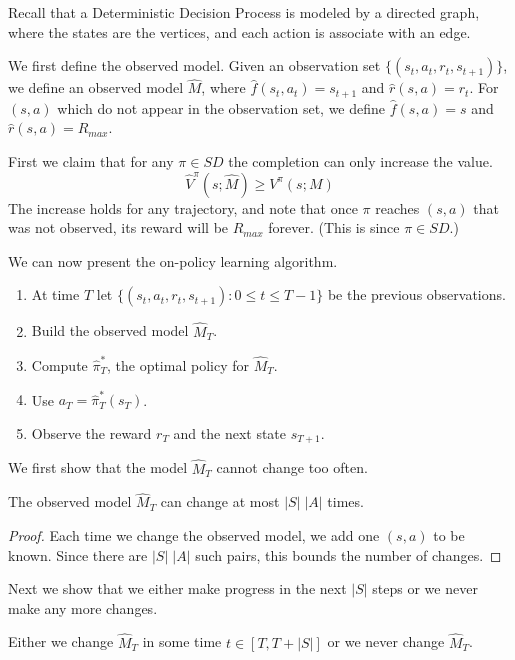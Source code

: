 Recall that a Deterministic Decision Process is modeled by a
directed graph, where the states are the vertices, and each action
is associate with an edge.

We first define the observed model. Given an observation set
$\{(s_t,a_t ,r_t, s_{t+1})\}$, we define an observed model
$\widehat{M}$, where $\widehat{f}(s_t,a_t)=s_{t+1}$ and $\widehat{r}(s,a)=r_t$.
For $(s,a)$ which do not appear in the observation set, we define
$\widehat{f}(s,a)=s$ and $\widehat{r}(s,a)=R_{max}$.

First we claim that for any $\pi\in SD$ the completion can only
increase the value.
\[
\widehat{V}^\pi(s;\widehat{M})\geq V^\pi(s;M)
\]
The increase holds for any trajectory, and note that once $\pi$
reaches $(s,a)$ that was not observed, its reward will be $R_{max}$
forever. (This is since $\pi\in SD$.)

We can now present the on-policy learning algorithm.
\begin{enumerate}
\item
At time $T$ let $\{(s_t,a_t,r_t,s_{t+1}): 0\leq t\leq T-1\}$ be the
previous observations.
\item
Build the observed model $\widehat{M}_T$.
\item
Compute $\widehat{\pi}^*_T$,
the optimal policy for $\widehat{M}_T$.
\item
Use $a_T=\widehat{\pi}^*_T(s_{T})$.
\item
Observe the reward $r_T$ and the next state $s_{T+1}$.
\end{enumerate}

We first show that the model $\widehat{M}_T$ cannot change too often.

\begin{lemma}
The observed model $\widehat{M}_T$ can change at most $|S|\;|A|$ times.
\end{lemma}

\begin{proof}
Each time we change the observed model, we add one $(s,a)$ to be
known. Since there are $|S|\;|A|$ such pairs, this bounds the number
of changes.
\end{proof}

Next we show that we either make progress in the next $|S|$ steps or
we never make any more changes.

\begin{lemma}
Either we change $\widehat{M}_T$ in some time $t\in[T,T+|S|]$ or we
never change $\widehat{M}_T$.
\end{lemma}

